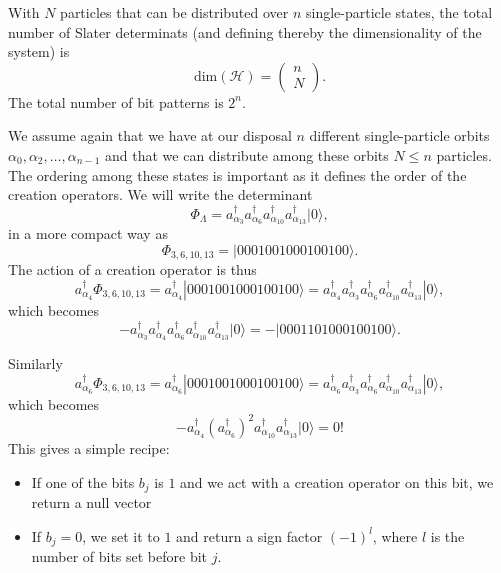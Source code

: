 \documentclass[graybox,sectrefs,envcountresetchap,open=right]{svmonodo}
\begin{document}
With $N$ particles that can be distributed over $n$ single-particle states, the total number of Slater determinats (and defining thereby the dimensionality of the system) is
\[
\mathrm{dim}(\mathcal{H}) = \left(\begin{array}{c} n \\N\end{array}\right).
\]
The total number of bit patterns is $2^n$. 


We assume again that we have at our disposal $n$ different single-particle orbits
$\alpha_0,\alpha_2,\dots,\alpha_{n-1}$ and that we can distribute  among these orbits $N\le n$ particles.
The ordering among these states is important as it defines the order of the creation operators.
We will write the determinant 
\[
\Phi_{\Lambda} = a_{\alpha_3}^{\dagger} a_{\alpha_6}^{\dagger} a_{\alpha_{10}}^{\dagger} a_{\alpha_{13}}^{\dagger} |0\rangle,
\]
in a more compact way as 
\[
\Phi_{3,6,10,13} = |0001001000100100\rangle.
\]
The action of a creation operator is thus
\[
a^{\dagger}_{\alpha_4}\Phi_{3,6,10,13} = a^{\dagger}_{\alpha_4}|0001001000100100\rangle=a^{\dagger}_{\alpha_4}a_{\alpha_3}^{\dagger} a_{\alpha_6}^{\dagger} a_{\alpha_{10}}^{\dagger} a_{\alpha_{13}}^{\dagger} |0\rangle,
\]
which becomes
\[
-a_{\alpha_3}^{\dagger} a^{\dagger}_{\alpha_4} a_{\alpha_6}^{\dagger} a_{\alpha_{10}}^{\dagger} a_{\alpha_{13}}^{\dagger} |0\rangle=-|0001101000100100\rangle.
\]


Similarly
\[
a^{\dagger}_{\alpha_6}\Phi_{3,6,10,13} = a^{\dagger}_{\alpha_6}|0001001000100100\rangle=a^{\dagger}_{\alpha_6}a_{\alpha_3}^{\dagger} a_{\alpha_6}^{\dagger} a_{\alpha_{10}}^{\dagger} a_{\alpha_{13}}^{\dagger} |0\rangle,
\]
which becomes
\[
-a^{\dagger}_{\alpha_4} (a_{\alpha_6}^{\dagger})^ 2 a_{\alpha_{10}}^{\dagger} a_{\alpha_{13}}^{\dagger} |0\rangle=0!
\]
This gives a simple recipe:  
\begin{itemize}
\item If one of the bits $b_j$ is $1$ and we act with a creation operator on this bit, we return a null vector

\item If $b_j=0$, we set it to $1$ and return a sign factor $(-1)^l$, where $l$ is the number of bits set before bit $j$.
\end{itemize}
\end{document}
